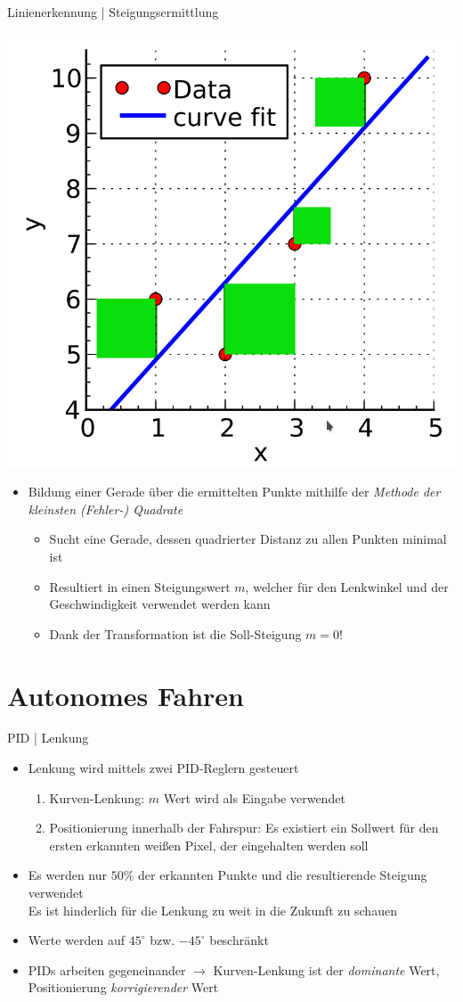 \documentclass[aspectratio=169]{beamer}
\newcommand{\enquote}[1]{\glqq{}#1\grqq{}}
\begin{document}
\begin{frame}{Linienerkennung | Steigungsermittlung}
	\begin{center}
		\includegraphics[width=.25\textwidth]{img/least_squared.png}
	\end{center}
	\begin{itemize}
		\item Bildung einer Gerade über die ermittelten Punkte mithilfe der \emph{Methode der kleinsten (Fehler-) Quadrate}
		      \begin{itemize}
			      \item Sucht eine Gerade, dessen quadrierter Distanz zu allen Punkten minimal ist
			      \item Resultiert in einen Steigungswert $m$, welcher für den Lenkwinkel und der Geschwindigkeit verwendet werden kann
			      \item Dank der Transformation ist die Soll-Steigung $m=0$!
		      \end{itemize}
	\end{itemize}
\end{frame}

\section{Autonomes Fahren}

\begin{frame}{PID | Lenkung}
	\begin{itemize}
		\item Lenkung wird mittels zwei PID-Reglern gesteuert
		      \begin{enumerate}
			      \item Kurven-Lenkung: $m$ Wert wird als Eingabe verwendet
			      \item Positionierung innerhalb der Fahrspur: Es existiert ein Sollwert für den ersten erkannten weißen Pixel, der eingehalten werden soll
		      \end{enumerate}
		\item Es werden nur $50\%$ der erkannten Punkte und die resultierende Steigung verwendet\\
		       Es ist hinderlich für die Lenkung zu weit in die \enquote{Zukunft} zu schauen
		\item Werte werden auf $45^\circ$ bzw. $-45^\circ$ beschränkt
		\item PIDs arbeiten \enquote{gegeneinander} $\rightarrow$ Kurven-Lenkung ist der \emph{dominante} Wert, Positionierung \emph{korrigierender} Wert
	\end{itemize}
\end{frame}
\end{document}
